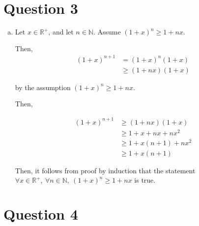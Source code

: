 \documentclass[12pt]{article}
\begin{document}
\section*{Question 3}
\begin{enumerate}[a.]
    \item

    Let $x \in \mathbb{R}^{+}$, and let $n \in \mathbb{N}$. Assume $(1+x)^n \geq
    1 + nx$.

    \bigskip

    Then,
    \setcounter{equation}{0}
    \begin{align}
        (1+x)^{n+1} &= (1+x)^n(1+x)\\
        &\geq (1+nx)(1+x)
    \end{align}

    by the assumption $(1+x)^n \geq 1 + nx$.

    \bigskip

    Then,

    \begin{align}
        (1+x)^{n+1} &\geq (1+nx)(1+x)\\
        &\geq 1 + x + nx + nx^2\\
        &\geq 1 + x(n+1) + nx^2\\
        &\geq 1 + x(n+1)
    \end{align}

    Then, it follows from proof by induction that the statement $\forall x \in
    \mathbb{R}^{+},\:\forall n \in \mathbb{N},\:(1+x)^n \geq 1 + nx$ is true.



\end{enumerate}

\section*{Question 4}
\end{document}
